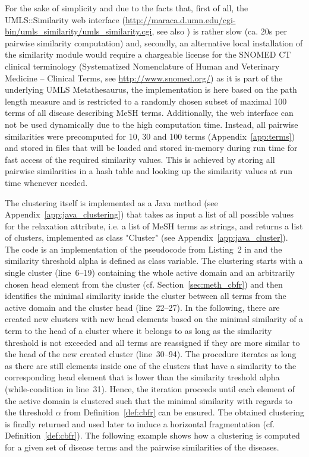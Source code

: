 For the sake of simplicity and due to the facts that, first of all, the UMLS::Similarity web interface
(\url{http://maraca.d.umn.edu/cgi-bin/umls_similarity/umls_similarity.cgi}, see also \citet{UMLS::Sim}) is rather slow (ca. 20s per pairwise similarity 
computation) and, secondly, an alternative local installation of the similarity module \citep{McInnes2009} would require a chargeable license for the SNOMED CT
clinical terminology (Systematized Nomenclature of Human and Veterinary Medicine – Clinical Terms, see \url{http://www.snomed.org/}) as it is part of the
underlying UMLS Metathesaurus, the implementation is here based on the path length measure and is restricted to a randomly chosen subset of maximal 100 terms 
of all disease describing MeSH terms. Additionally, the web interface can not be used dynamically due to the high computation time. Instead, all pairwise
similarities were precomputed for 10, 30 and 100 terms (Appendix~\ref{app:terms}) and stored in files that will be loaded and stored in-memory during run time
for fast access of the required similarity values. This is achieved by storing all pairwise similarities in a hash table and looking up the similarity values
at run time whenever needed.

The clustering itself is implemented as a Java method (see Appendix~\ref{app:java_clustering}) that takes as input a list of all possible values for the
relaxation attribute, i.e. a list of MeSH terms as strings, and returns a list of clusters, implemented as class "Cluster" (see
Appendix~\ref{app:java_cluster}). The code is an implementation of the pseudocode from Listing~2 in \cite{Wiese2014} and the similarity threshold alpha is
defined as class variable. The clustering starts with a single cluster (line~6--19) containing the whole active domain and an arbitrarily chosen head element 
from the cluster (cf. Section~\ref{sec:meth_cbfr}) and then identifies the minimal similarity inside the cluster between all terms from the active domain 
and the cluster head (line~22--27). In the following, there are created new clusters with new head elements based on the minimal similarity of a term to the 
head of a cluster where it belongs to as long as the similarity threshold is not exceeded and all terms are reassigned if they are more similar to the head
of the new created cluster (line~30--94). The procedure iterates as long as there are still elements inside one of the clusters that have a similarity to the
corresponding head element that is lower than the similarity treshold alpha (while-condition in line~31). Hence, the iteration proceeds until each element of 
the active domain is clustered such that the minimal similarity with regards to the threshold $\alpha$ from Definition~\ref{def:cbfr} can be ensured. The 
obtained clustering is finally returned and used later to induce a horizontal fragmentation (cf. Definition~\ref{def:cbfr}).
The following example shows how a clustering is computed for a given set of disease terms and the pairwise similarities of the diseases.

